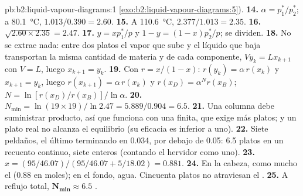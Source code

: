 \begin{solution}{pb:b2:liquid-vapour-diagrams:1}
\cref{exo:b2:liquid-vapour-diagrams:5}).
\textbf{14.} $\alpha = p_1^*/p_2^*$; a \qty{80.1}{\degreeCelsius}, $1.013/0.390 =
2.60$.
\textbf{15.} A \qty{110.6}{\degreeCelsius}, $2.377/1.013 = 2.35$.
\textbf{16.} $\sqrt{2.60 \times 2.35} = 2.47$.
\textbf{17.} $y = xp_1^*/p$ y $1 - y = (1 - x)p_2^*/p$; se dividen.
\textbf{18.} No se extrae nada: entre dos platos el vapor que sube y
el líquido que baja transportan la misma cantidad de materia y de cada componente,
$V y_k = L x_{k+1}$ con $V = L$, luego $x_{k+1} = y_k$.
\textbf{19.} Con $r = x/(1 - x)$: $r(y_k) = \alpha\,r(x_k)$ y $x_{k+1} = y_k$, luego
$r(x_{k+1}) = \alpha\,r(x_k)$ y $r(x_D) = \alpha^N r(x_B)$; $N = \ln[r(x_D)/
r(x_B)]/\ln\alpha$.
\textbf{20.} $N_{\min} = \ln(19 \times 19)/\ln 2.47 = 5.889/0.904 = 6.5$.
\textbf{21.} Una columna debe suministrar producto, así que funciona con una  finita,
que exige más platos; y un plato real no alcanza el equilibrio (su
eficacia es inferior a uno).
\textbf{22.} Siete peldaños, el último terminando en 0.034, por debajo de 0.05: 6.5 platos en un
recuento continuo, siete enteros (contando el hervidor como uno).
\textbf{23.} $x = (95/46.07)/(95/46.07 + 5/18.02) = 0.881$.
\textbf{24.} En la cabeza, como mucho el  (0.88 en moles); en el fondo,
agua. Cincuenta platos no atraviesan el .
\textbf{25.} A reflujo total, $\boldsymbol{N_{\min} \approx 6.5}$ .
\end{solution}

